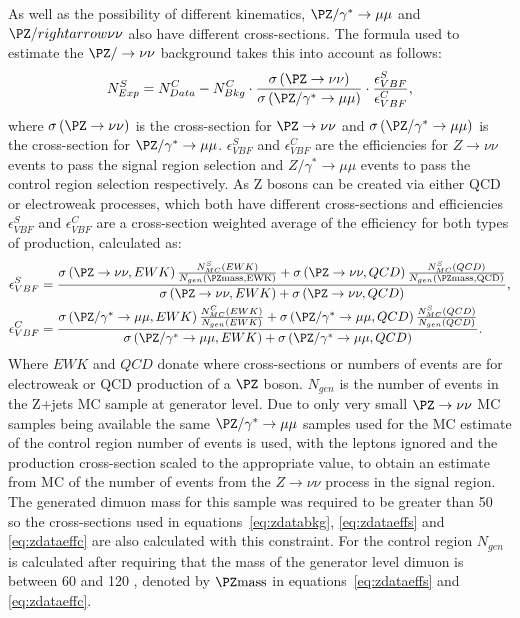 As well as the possibility of different kinematics, $\PZ/\gamma^{*}\rightarrow\mu\mu$ and $\PZ/rightarrow\nu\nu$ also have different cross-sections. The formula used to estimate the $\PZ/\rightarrow\nu\nu$ background takes this into account as follows:
\begin{equation}
  \label{eq:zdatabkg}
  N^{S}_{Exp}=N^{C}_{Data}-N^{C}_{Bkg}\cdot\frac{\sigma\left(\PZ\rightarrow\nu\nu\right)}{\sigma\left(\PZ/\gamma^{*}\rightarrow\mu\mu\right)}\cdot\frac{\epsilon^{S}_{VBF}}{\epsilon^{C}_{VBF}},
\end{equation}
where $\sigma\left(\PZ\rightarrow\nu\nu\right)$ is the cross-section for $\PZ\rightarrow\nu\nu$ and $\sigma\left(\PZ/\gamma^{*}\rightarrow\mu\mu\right)$ is the cross-section for $\PZ/\gamma^{*}\rightarrow\mu\mu$. $\epsilon^{S}_{VBF}$ and $\epsilon^{C}_{VBF}$ are the efficiencies for $Z\rightarrow\nu\nu$ events to pass the signal region selection and $Z/\gamma^{*}\rightarrow\mu\mu$ events to pass the control region selection respectively. As Z bosons can be created via either \ac{QCD} or electroweak processes, which both have different cross-sections and efficiencies $\epsilon^{S}_{VBF}$ and $\epsilon^{C}_{VBF}$ are a cross-section weighted average of the efficiency for both types of production, calculated as:
\begin{align}
  \label{eq:zdataeffs}
  \epsilon^{S}_{VBF}&=\frac{ \sigma\left(\PZ\rightarrow\nu\nu,EWK\right) \frac{N^{S}_{MC}\left(EWK\right)} {N_{gen}\left(\PZ \rm{mass},EWK\right)} + \sigma\left(\PZ\rightarrow\nu\nu,QCD\right) \frac{N^{S}_{MC}\left(QCD\right)} {N_{gen}\left(\PZ \rm{mass},QCD\right)} } {\sigma\left(\PZ\rightarrow\nu\nu,EWK\right) + \sigma\left(\PZ\rightarrow\nu\nu,QCD\right)},\\
  \label{eq:zdataeffc}
  \epsilon^{C}_{VBF}&=\frac{  \sigma\left(\PZ/\gamma^{*}\rightarrow\mu\mu,EWK\right) \frac{N^{C}_{MC}\left(EWK\right)} {N_{gen}\left(EWK\right)} + \sigma\left(\PZ/\gamma^{*}\rightarrow\mu\mu,QCD\right) \frac{N^{S}_{MC}\left(QCD\right)} {N_{gen}\left(QCD\right)}  }{\sigma\left(\PZ/\gamma^{*}\rightarrow\mu\mu,EWK\right)+\sigma\left(\PZ/\gamma^{*}\rightarrow\mu\mu,QCD\right)}.
\end{align}
Where $EWK$ and $QCD$ donate where cross-sections or numbers of events are for electroweak or \ac{QCD} production of a $\PZ$ boson. $N_{gen}$ is the number of events in the Z+jets \ac{MC} sample at generator level. Due to only very small $\PZ\rightarrow\nu\nu$ \ac{MC} samples being available the same $\PZ/\gamma^{*}\rightarrow\mu\mu$ samples used for the \ac{MC} estimate of the control region number of events is used, with the leptons ignored and the production cross-section scaled to the appropriate value, to obtain an estimate from \ac{MC} of the number of events from the $Z\rightarrow\nu\nu$ process in the signal region. The generated dimuon mass for this sample was required to be greater than 50 \GeV\,so the cross-sections used in equations~\ref{eq:zdatabkg}, \ref{eq:zdataeffs} and \ref{eq:zdataeffc} are also calculated with this constraint. For the control region $N_{gen}$ is calculated after requiring that the mass of the generator level dimuon is between 60 and 120 \GeV, denoted by $\PZ \rm{mass}$ in equations~\ref{eq:zdataeffs} and \ref{eq:zdataeffc}.

